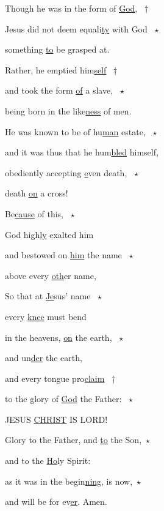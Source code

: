 \noindent Though he was in the form of \uline{God}, ~†~\nopagebreak

Jesus did not deem equali\uline{ty} with God ~$\star$~\nopagebreak

something \uline{to} be grasped at.

\noindent Rather, he emptied him\uline{self} ~†~\nopagebreak

and took the form \uline{of} a slave, ~$\star$~\nopagebreak

being born in the like\uline{ness} of men.

\noindent He was known to be of hu\uline{man} estate, ~$\star$~\nopagebreak

and it was thus that he hum\uline{bled} himself,

\noindent obediently accepting \uline{e}ven death, ~$\star$~\nopagebreak

death \uline{on} a cross!

\noindent Be\uline{cause} of this, ~$\star$~\nopagebreak

God high\uline{ly} exalted him

\noindent and bestowed on \uline{him} the name ~$\star$~\nopagebreak

above every \uline{oth}er name,

\noindent So that at \uline{Je}sus’ name ~$\star$~\nopagebreak

every \uline{knee} must bend

\noindent in the heavens, \uline{on} the earth, ~$\star$~\nopagebreak

and un\uline{der} the earth,

\noindent and every tongue pro\uline{claim} ~†~\nopagebreak

to the glory of \uline{God} the Father: ~$\star$~\nopagebreak

JESUS \uline{CHRIST} IS LORD!

\noindent Glory to the Father, and \uline{to} the Son,~$\star$~\nopagebreak

and to the \uline{Ho}ly Spirit:

\noindent as it was in the begin\uline{ning}, is now,~$\star$~\nopagebreak

and will be for ev\uline{er}. Amen.